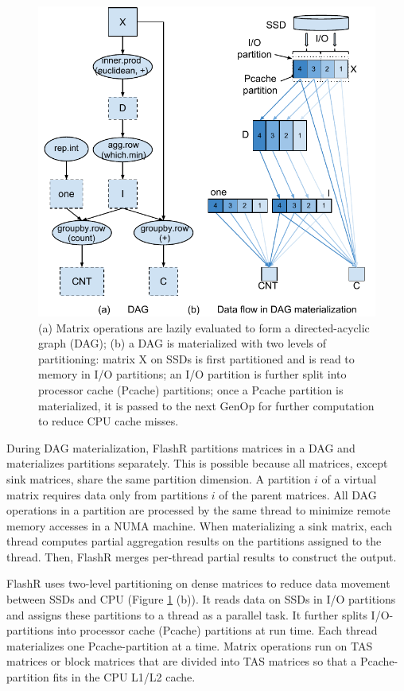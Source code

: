\begin{figure}
	\centering
	\includegraphics[scale=0.6]{FlashMatrix_figs/kmeans.pdf}
  \vspace{-4pt}
	\caption{(a) Matrix operations are lazily evaluated to form
	a directed-acyclic graph (DAG); (b) a DAG is materialized with
	two levels of partitioning: matrix X on SSDs is first partitioned
	and is read to memory in I/O partitions; an I/O partition is further
	split into processor cache (Pcache) partitions; once a Pcache partition
	is materialized, it is passed to the next GenOp for further computation
	to reduce CPU cache misses. }
	\label{fig:dag}
  \vspace{-8pt}
\end{figure}

During DAG materialization, FlashR partitions matrices in a DAG and
materializes partitions separately.
This is possible because all matrices, except
sink matrices, share the same partition dimension. 
A partition $i$ of a virtual matrix requires data only from partitions
$i$ of the parent matrices.  All DAG operations in a partition are processed by 
the same thread to minimize remote memory accesses in a NUMA machine.
When materializing a sink matrix, each thread computes partial
aggregation results on the partitions assigned to the thread. 
Then, FlashR merges per-thread partial results to construct the output.

FlashR uses two-level partitioning on dense matrices to reduce data movement
between SSDs and CPU (Figure \ref{fig:dag} (b)). It reads data on SSDs in
I/O partitions and assigns these partitions to a thread as a parallel task.
It further splits I/O-partitions into processor cache (Pcache)
partitions at run time.  Each thread materializes one Pcache-partition
at a time. Matrix operations run on TAS matrices or block matrices that are
divided into TAS matrices so that a Pcache-partition fits in the CPU L1/L2 cache.

